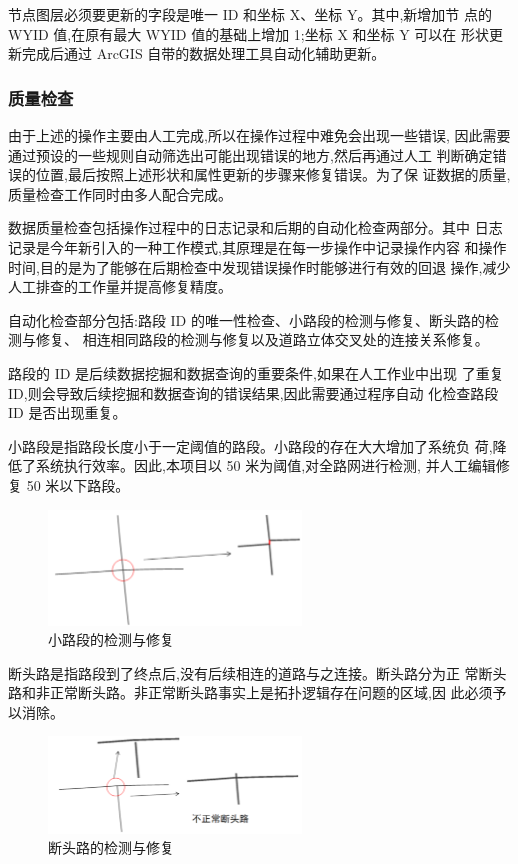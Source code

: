 节点图层必须要更新的字段是唯一 ID 和坐标 X、坐标 Y。其中,新增加节
点的 WYID 值,在原有最大 WYID 值的基础上增加 1;坐标 X 和坐标 Y 可以在
形状更新完成后通过 ArcGIS 自带的数据处理工具自动化辅助更新。

\subsubsection{质量检查}
由于上述的操作主要由人工完成,所以在操作过程中难免会出现一些错误,
因此需要通过预设的一些规则自动筛选出可能出现错误的地方,然后再通过人工
判断确定错误的位置,最后按照上述形状和属性更新的步骤来修复错误。为了保
证数据的质量,质量检查工作同时由多人配合完成。

数据质量检查包括操作过程中的日志记录和后期的自动化检查两部分。其中
日志记录是今年新引入的一种工作模式,其原理是在每一步操作中记录操作内容
和操作时间,目的是为了能够在后期检查中发现错误操作时能够进行有效的回退
操作,减少人工排查的工作量并提高修复精度。

自动化检查部分包括:路段 ID 的唯一性检查、小路段的检测与修复、断头路的检测与修复、
相连相同路段的检测与修复以及道路立体交叉处的连接关系修复。

路段的 ID 是后续数据挖掘和数据查询的重要条件,如果在人工作业中出现
了重复 ID,则会导致后续挖掘和数据查询的错误结果,因此需要通过程序自动
化检查路段 ID 是否出现重复。

小路段是指路段长度小于一定阈值的路段。小路段的存在大大增加了系统负
荷,降低了系统执行效率。因此,本项目以 50 米为阈值,对全路网进行检测,
并人工编辑修复 50 米以下路段。

\begin{figure}[ht]
  \centering
  \includegraphics[width=0.6\textwidth]{figures/chp02_小路段的检测与修复.png}
  \caption{小路段的检测与修复\label{fig:小路段的检测与修复}}
\end{figure}

断头路是指路段到了终点后,没有后续相连的道路与之连接。断头路分为正
常断头路和非正常断头路。非正常断头路事实上是拓扑逻辑存在问题的区域,因
此必须予以消除。

\begin{figure}[ht]
  \centering
  \includegraphics[width=0.6\textwidth]{figures/chp02_断头路的检测与修复.png}
  \caption{断头路的检测与修复\label{fig:断头路的检测与修复}}
\end{figure}

